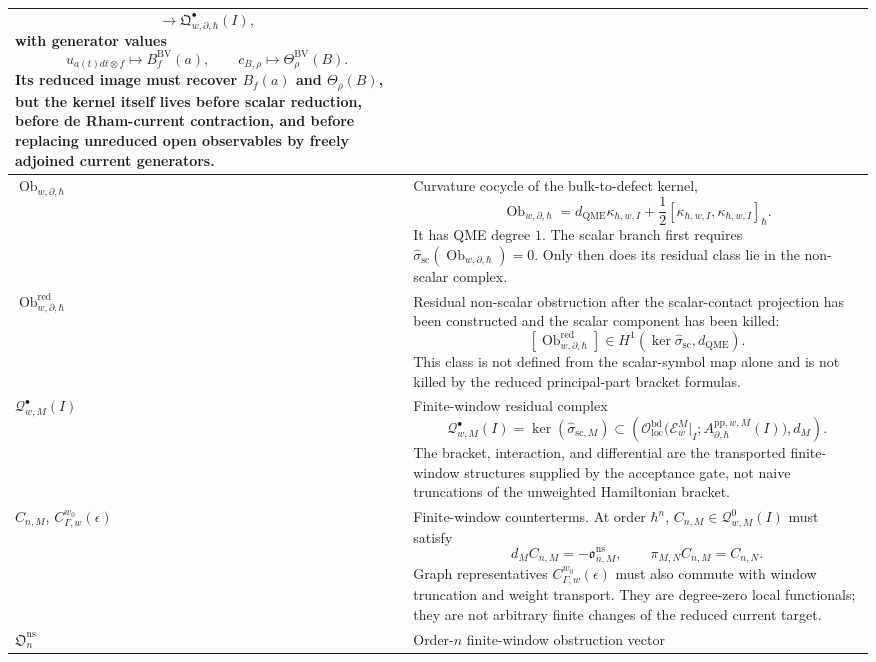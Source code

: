 \begin{longtable}{@{}>{\raggedright\arraybackslash}p{}
  >{\raggedright\arraybackslash}p{}@{}}
\[  \longrightarrow
  \mathfrak Q^\bullet_{w,\partial,\hbar}(I),
\]
with generator values
\[
  u_{a(t)dt\otimes f}\mapsto B_f^{\mathrm{BV}}(a),
  \qquad
  c_{B,\rho}\mapsto\Theta_\rho^{\mathrm{BV}}(B).
\]
Its reduced image must recover \(B_f(a)\) and \(\Theta_\rho(B)\), but the
kernel itself lives before scalar reduction, before de Rham-current
contraction, and before replacing unreduced open observables by freely
adjoined current generators.\\
\hline
\(\operatorname{Ob}_{w,\partial,\hbar}\) &
Curvature cocycle of the bulk-to-defect kernel,
\[
  \operatorname{Ob}_{w,\partial,\hbar}
    =
  d_{\mathrm{QME}}\kappa_{\hbar,w,I}
  +\frac12[\kappa_{\hbar,w,I},\kappa_{\hbar,w,I}]_\hbar .
\]
It has QME degree \(1\).  The scalar branch first requires
\(\widehat\sigma_{\mathrm{sc}}(\operatorname{Ob}_{w,\partial,\hbar})=0\).
Only then does its residual class lie in the non-scalar complex.\\
\hline
\(\operatorname{Ob}^{\mathrm{red}}_{w,\partial,\hbar}\) &
Residual non-scalar obstruction after the scalar-contact projection has
been constructed and the scalar component has been killed:
\[
  [\operatorname{Ob}^{\mathrm{red}}_{w,\partial,\hbar}]
  \in
  H^1\!\left(
    \ker\widehat\sigma_{\mathrm{sc}},
    d_{\mathrm{QME}}
  \right).
\]
This class is not defined from the scalar-symbol map alone and is not
killed by the reduced principal-part bracket formulas.\\
\hline
\(\mathcal Q^\bullet_{w,M}(I)\) &
Finite-window residual complex
\[
  \mathcal Q^\bullet_{w,M}(I)
    =
  \ker(\widehat\sigma_{\mathrm{sc},M})
  \subset
  \left(
    \mathcal O_{\mathrm{loc}}^{\mathrm{bd}}\bigl(
      \mathcal E_w^M|_I;
      A_{\partial,\hbar}^{\mathrm{pp},w,M}(I)\bigr),
    d_M
  \right).
\]
The bracket, interaction, and differential are the transported
finite-window structures supplied by the acceptance gate, not naive
truncations of the unweighted Hamiltonian bracket.\\
\hline
\(C_{n,M}\), \(C_{\Gamma,w}^{w_0}(\epsilon)\) &
Finite-window counterterms.  At order \(\hbar^n\),
\(C_{n,M}\in\mathcal Q^0_{w,M}(I)\) must satisfy
\[
  d_MC_{n,M}=-\mathfrak o^{\mathrm{ns}}_{n,M},
  \qquad
  \pi_{M,N}C_{n,M}=C_{n,N}.
\]
Graph representatives \(C_{\Gamma,w}^{w_0}(\epsilon)\) must also commute
with window truncation and weight transport.  They are degree-zero local
functionals; they are not arbitrary finite changes of the reduced current
target.\\
\hline
\(\mathfrak O^{\mathrm{ns}}_n\) &
Order-\(n\) finite-window obstruction vector

\end{longtable}
